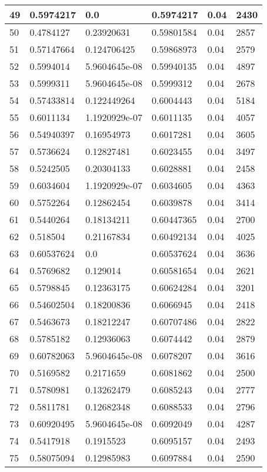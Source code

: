 \begin{longtable}{|l|l|l|l|l|l|}
49 & 0.5974217 & 0.0 & 0.5974217 & 0.04 & 2430 \\ \hline 
50 & 0.4784127 & 0.23920631 & 0.59801584 & 0.04 & 2857 \\ \hline 
51 & 0.57147664 & 0.124706425 & 0.59868973 & 0.04 & 2579 \\ \hline 
52 & 0.5994014 & 5.9604645e-08 & 0.59940135 & 0.04 & 4897 \\ \hline 
53 & 0.5999311 & 5.9604645e-08 & 0.5999312 & 0.04 & 2678 \\ \hline 
54 & 0.57433814 & 0.122449264 & 0.6004443 & 0.04 & 5184 \\ \hline 
55 & 0.6011134 & 1.1920929e-07 & 0.6011135 & 0.04 & 4057 \\ \hline 
56 & 0.54940397 & 0.16954973 & 0.6017281 & 0.04 & 3605 \\ \hline 
57 & 0.5736624 & 0.12827481 & 0.6023455 & 0.04 & 3497 \\ \hline 
58 & 0.5242505 & 0.20304133 & 0.6028881 & 0.04 & 2458 \\ \hline 
59 & 0.6034604 & 1.1920929e-07 & 0.6034605 & 0.04 & 4363 \\ \hline 
60 & 0.5752264 & 0.12862454 & 0.6039878 & 0.04 & 3414 \\ \hline 
61 & 0.5440264 & 0.18134211 & 0.60447365 & 0.04 & 2700 \\ \hline 
62 & 0.518504 & 0.21167834 & 0.60492134 & 0.04 & 4025 \\ \hline 
63 & 0.60537624 & 0.0 & 0.60537624 & 0.04 & 3636 \\ \hline 
64 & 0.5769682 & 0.129014 & 0.60581654 & 0.04 & 2621 \\ \hline 
65 & 0.5798845 & 0.12363175 & 0.60624284 & 0.04 & 3201 \\ \hline 
66 & 0.54602504 & 0.18200836 & 0.6066945 & 0.04 & 2418 \\ \hline 
67 & 0.5463673 & 0.18212247 & 0.60707486 & 0.04 & 2822 \\ \hline 
68 & 0.5785182 & 0.12936063 & 0.6074442 & 0.04 & 2879 \\ \hline 
69 & 0.60782063 & 5.9604645e-08 & 0.6078207 & 0.04 & 3616 \\ \hline 
70 & 0.5169582 & 0.2171659 & 0.6081862 & 0.04 & 2500 \\ \hline 
71 & 0.5780981 & 0.13262479 & 0.6085243 & 0.04 & 2777 \\ \hline 
72 & 0.5811781 & 0.12682348 & 0.6088533 & 0.04 & 2796 \\ \hline 
73 & 0.60920495 & 5.9604645e-08 & 0.6092049 & 0.04 & 4287 \\ \hline 
74 & 0.5417918 & 0.1915523 & 0.6095157 & 0.04 & 2493 \\ \hline 
75 & 0.58075094 & 0.12985983 & 0.6097884 & 0.04 & 2590 \\ \hline 
\end{longtable}